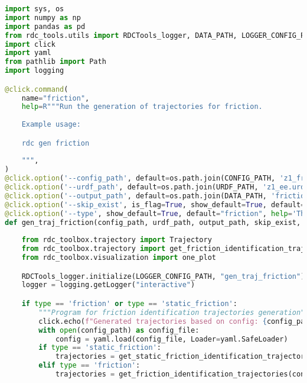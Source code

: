 \begin{lstlisting}[language=python, caption=\raggedright{generation/gen\_trajectory\_friction.py}, frame=single]
import sys, os
import numpy as np
import pandas as pd
from rdc_tools.utils import RDCTools_logger, DATA_PATH, LOGGER_CONFIG_PATH, CONFIG_PATH, URDF_PATH
import click
import yaml
from pathlib import Path
import logging

@click.command(
    name="friction",
    help=R"""Run the generation of trajectories for friction.
    
    Example usage:

    rdc gen friction
    
    """,
)
@click.option('--config_path', default=os.path.join(CONFIG_PATH, 'z1_friction_gen_traj_config.yaml'), help='Path to config for trajectory generation')
@click.option('--urdf_path', default=os.path.join(URDF_PATH, 'z1_ee.urdf'), help='Path to urdf model')
@click.option('--output_path', default=os.path.join(DATA_PATH, 'friction'), help='Path to save trajectories')
@click.option('--skip_exist', is_flag=True, show_default=True, default=False, help='If true, script will skip folders where desired.csv already exists')
@click.option('--type', show_default=True, default="friction", help='The type of trajectories that will be generated: friction|base')
def gen_traj_friction(config_path, urdf_path, output_path, skip_exist, type):
    
    from rdc_toolbox.trajectory import Trajectory
    from rdc_toolbox.trajectory import get_friction_identification_trajectories, get_static_friction_identification_trajectories
    from rdc_toolbox.visualization import one_plot

    RDCTools_logger.initialize(LOGGER_CONFIG_PATH, "gen_traj_friction")
    logger = logging.getLogger("interactive")   

    if type == 'friction' or type == 'static_friction':
        """Program for friction identification trajectories generation"""
        click.echo(f"Generated trajectories based on config: {config_path}")
        with open(config_path) as config_file:
            config = yaml.load(config_file, Loader=yaml.SafeLoader)
        if type == 'static_friction':
            trajectories = get_static_friction_identification_trajectories(config, urdf_path)
        elif type == 'friction':
            trajectories = get_friction_identification_trajectories(config, urdf_path)


\end{lstlisting}
